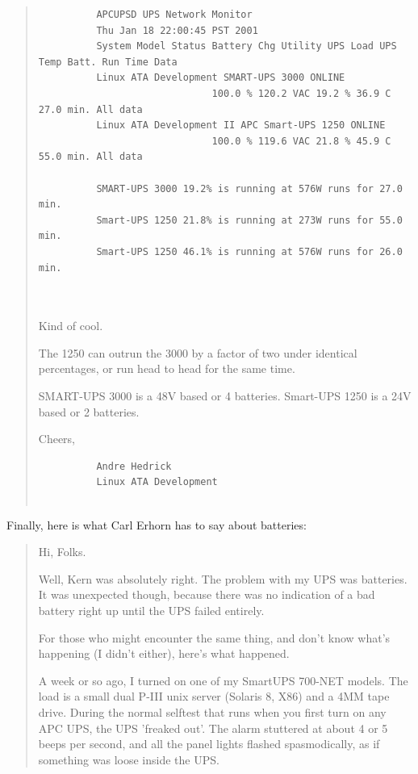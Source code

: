 {{{{{{{{\begin{quote}
\begin{verbatim}
          APCUPSD UPS Network Monitor
          Thu Jan 18 22:00:45 PST 2001
          System Model Status Battery Chg Utility UPS Load UPS Temp Batt. Run Time Data
          Linux ATA Development SMART-UPS 3000 ONLINE
                              100.0 % 120.2 VAC 19.2 % 36.9 C 27.0 min. All data
          Linux ATA Development II APC Smart-UPS 1250 ONLINE
                              100.0 % 119.6 VAC 21.8 % 45.9 C 55.0 min. All data
          
          SMART-UPS 3000 19.2% is running at 576W runs for 27.0 min.
          Smart-UPS 1250 21.8% is running at 273W runs for 55.0 min.
          Smart-UPS 1250 46.1% is running at 576W runs for 26.0 min.
          
     
\end{verbatim}
\normalsize

Kind of cool.  

The 1250 can outrun the 3000 by a factor of two under identical percentages,
or run head to head for the same time.  

SMART-UPS 3000 is a 48V based or 4 batteries.  Smart-UPS 1250 is a 24V based
or 2 batteries.  

Cheers,  

\footnotesize
\begin{verbatim}
          Andre Hedrick
          Linux ATA Development
     
\end{verbatim}
\normalsize

\end{quote}

Finally, here is what Carl Erhorn has to say about batteries:  

\begin{quote}

Hi, Folks.  

Well, Kern was absolutely right. The problem with my UPS was batteries. It was
unexpected though, because there was no indication of a bad battery right up
until the UPS failed entirely.  

For those who might encounter the same thing, and don't know what's happening
(I didn't either), here's what happened.  

A week or so ago, I turned on one of my SmartUPS 700-NET models. The load is a
small dual P-III unix server (Solaris 8, X86) and a 4MM tape drive. During the
normal selftest that runs when you first turn on any APC UPS, the UPS 'freaked
out'. The alarm stuttered at about 4 or 5 beeps per second, and all the panel
lights flashed spasmodically, as if something was loose inside the UPS.  


\end{quote}}}}}}}}}
